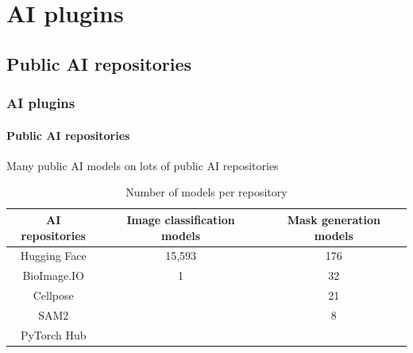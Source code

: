 \def\sectiontitle{AI plugins}

\section{\sectiontitle}

\def\slidetitle{Public AI repositories}

\subsection{\slidetitle}
\begin{frame}
  \frametitle{\sectiontitle}
  \framesubtitle{\slidetitle}

  Many public AI models on lots of public AI repositories

  \begin{center}
    \begin{table}
      \begin{tabular}{|c|c|c|}
       \hline
       \rowcolor{tableFirstRowColor} AI repositories & Image classification models & Mask generation models \\ [0.5ex]
       \hline
       \cellcolor{tableFirstColColor} Hugging Face & 15,593 & 176 \\
       \hline
       \cellcolor{tableFirstColColor} BioImage.IO & 1 & 32 \\
       \hline
       \cellcolor{tableFirstColColor} Cellpose &  & 21 \\
       \hline
       \cellcolor{tableFirstColColor} SAM2 &  & 8 \\
       \hline
       \cellcolor{tableFirstColColor} PyTorch Hub &  & \\
       \hline
      \end{tabular}
      \caption{Number of models per repository}
    \end{table}
  \end{center}
\end{frame}

\def\slidetitle{Unlock theses repositories}


